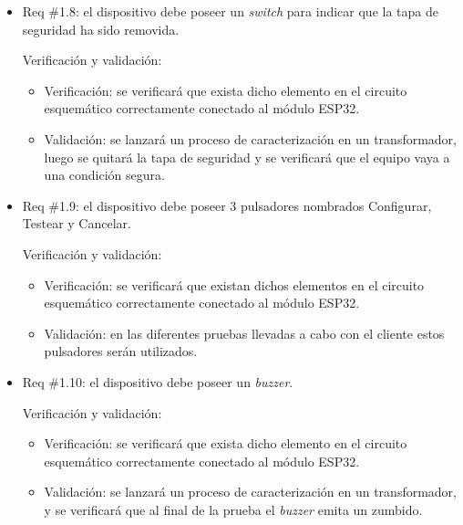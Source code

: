 \documentclass[11pt]{charter}
\begin{document}
\begin{itemize} 
\item Req \#1.8: el dispositivo debe poseer un \textit{switch} para indicar que la tapa de seguridad ha sido removida.

Verificación y validación:

\begin{itemize}
\item Verificación: se verificará que exista dicho elemento en el circuito esquemático correctamente conectado al módulo ESP32.
\item Validación: se lanzará un proceso de caracterización en un transformador, luego se quitará la tapa de seguridad y se verificará que el equipo vaya a una condición segura.
\end{itemize}

\end{itemize}

\begin{itemize} 
\item Req \#1.9: el dispositivo debe poseer 3 pulsadores nombrados Configurar, Testear y Cancelar.

Verificación y validación:

\begin{itemize}
\item Verificación: se verificará que existan dichos elementos en el circuito esquemático correctamente conectado al módulo ESP32.
\item Validación: en las diferentes pruebas llevadas a cabo con el cliente estos pulsadores serán utilizados.
\end{itemize}

\end{itemize}

\begin{itemize} 
\item Req \#1.10: el dispositivo debe poseer un \textit{buzzer}.

Verificación y validación:

\begin{itemize}
\item Verificación: se verificará que exista dicho elemento en el circuito esquemático correctamente conectado al módulo ESP32.
\item Validación: se lanzará un proceso de caracterización en un transformador, y se verificará que al final de la prueba el \textit{buzzer} emita un zumbido.
\end{itemize}

\end{itemize}
\end{document}
